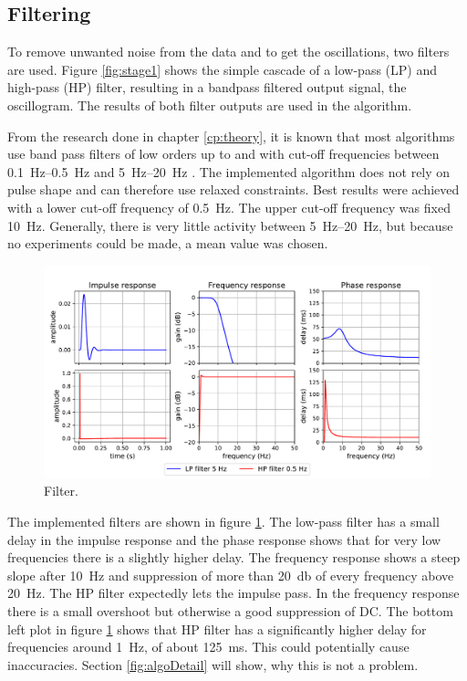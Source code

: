 \subsection{Filtering}
To remove unwanted noise from the data and to get the oscillations, two filters are used. Figure \ref{fig:stage1} shows the simple cascade of a low-pass (LP) and high-pass (HP) filter, resulting in a bandpass filtered output signal, the oscillogram. The results of both filter outputs are used in the algorithm.
%

From the research done in chapter \ref{cp:theory}, it is known that most algorithms use band pass filters of low orders up to  and with cut-off frequencies between \SIrange{0.1}{0.5}{\Hz} and \SIrange{5}{20}{\Hz} \citep{Forouzanfar2015}. The implemented algorithm does not rely on pulse shape and can therefore use relaxed constraints. Best results were achieved with a lower cut-off frequency of \SI{0.5}{\Hz}. The upper cut-off frequency was fixed \SI{10}{\Hz}. Generally, there is very little activity between \SIrange{5}{20}{\Hz}, but because no experiments could be made, a mean value was chosen. 

\begin{figure}[ht]
\centering
\includegraphics[width=\textwidth]{figures/filter.pdf}
\caption{Filter.}
\label{fig:filters}
\end{figure}
The implemented filters are shown in figure \ref{fig:filters}. The low-pass filter has a small delay in the impulse response and the phase response shows that for very low frequencies there is a slightly higher delay. The frequency response shows a steep slope after \SI{10}{\Hz} and suppression of more than \SI{20}{\decibel} of every frequency above \SI{20}{\Hz}. The HP filter expectedly lets the impulse pass. In the frequency response there is a small overshoot but otherwise a good suppression of DC. The bottom left plot in figure \ref{fig:filters} shows that HP filter has a significantly higher delay for frequencies around \SI{1}{\Hz}, of about \SI{125}{\milli\second}. This could potentially cause inaccuracies. Section \ref{fig:algoDetail} will show, why this is not a problem.



